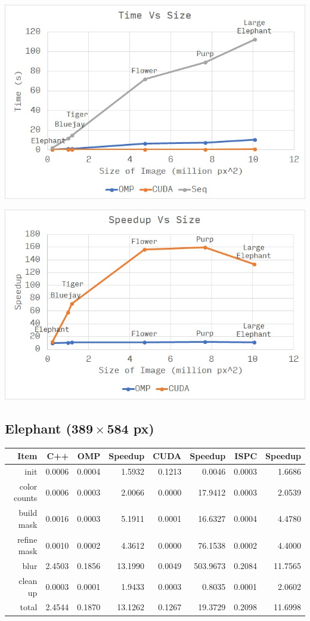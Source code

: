 \documentclass[12pt]{article}
\begin{document}
\begin{center}
\includegraphics[scale=1]{time.jpg}
\end{center}

\begin{center}
\includegraphics[scale=1]{speedup.jpg}
\end{center}

\subsection{Elephant ($\mathbf{389 \times 584}$ px)}

\begin{tabular}{r|r|r|r|r|r|r|r}
    Item & C++ & OMP & Speedup & CUDA & Speedup & ISPC & Speedup
\\  \hline
    init & 0.0006 & 0.0004 & 1.5932 & 0.1213 & 0.0046 & 0.0003 & 1.6686
\\  color counts & 0.0006 & 0.0003 & 2.0066 & 0.0000 & 17.9412 & 0.0003 & 2.0539
\\  build mask & 0.0016 & 0.0003 & 5.1911 & 0.0001 & 16.6327 & 0.0004 & 4.4780
\\  refine mask & 0.0010 & 0.0002 & 4.3612 & 0.0000 & 76.1538 & 0.0002 & 4.4000
\\  blur & 2.4503 & 0.1856 & 13.1990 & 0.0049 & 503.9673 & 0.2084 & 11.7565
\\  clean up & 0.0003 & 0.0001 & 1.9433 & 0.0003 & 0.8035 & 0.0001 & 2.0602
\\  \hline
    total & 2.4544 & 0.1870 & 13.1262 & 0.1267 & 19.3729 & 0.2098 & 11.6998
\end{tabular}
\end{document}
